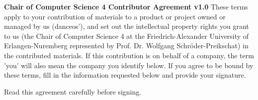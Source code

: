 \documentclass[12pt, a4paper]{article}
\begin{document}
\textbf{\large{Chair of Computer Science 4 Contributor Agreement
    v1.0}} \newline\newline These terms apply to your contribution of
materials to a product or project owned or managed by us (danceos'),
and set out the intellectual property rights you grant to us (the
Chair of Computer Science 4 at the Friedrich-Alexander University of
Erlangen-Nuremberg represented by Prof. Dr. Wolfgang Schröder-Preikschat) in
the contributed materials. If this contribution is on behalf of a
company, the term 'you' will also mean the company you identify
below. If you agree to be bound by these terms, fill in the
information requested below and provide your signature.

Read this agreement carefully before signing.
\end{document}
